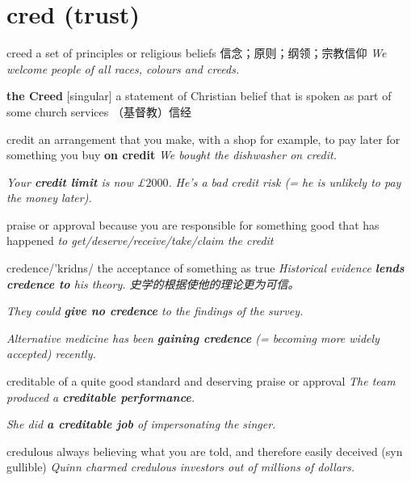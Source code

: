 \section{cred (trust)}

\begin{DefWord}{creed}
    a set of principles or religious beliefs 信念；原则；纲领；宗教信仰
    \textit{We welcome people of all races, colours and creeds.}

    \textbf{the Creed} [singular] a statement of Christian belief that is spoken as part of some church services （基督教）信经
\end{DefWord}

\begin{DefWord}{credit}
    an arrangement that you make, with a shop for example, to pay later for something you buy
    \textbf{on credit} \textit{We bought the dishwasher on credit.}

    \textit{Your \textbf{credit limit} is now \pounds$2 000$.}
    \textit{He's a bad credit risk (= he is unlikely to pay the money later).}

    praise or approval because you are responsible for something good that has happened
    \textit{to get/deserve/receive/take/claim the credit}
\end{DefWord}

\begin{DefWord}{credence}/'kridns/
    the acceptance of something as true
    \textit{Historical evidence \textbf{lends credence to} his theory. 史学的根据使他的理论更为可信。}

    \textit{They could \textbf{give no credence} to the findings of the survey.}

    \textit{Alternative medicine has been \textbf{gaining credence} (= becoming more widely accepted) recently.}
\end{DefWord}

\begin{DefWord}{creditable}
    of a quite good standard and deserving praise or approval
    \textit{The team produced a \textbf{creditable performance}.}

    \textit{She did \textbf{a creditable job} of impersonating the singer.}
\end{DefWord}

\begin{DefWord}{credulous}
    always believing what you are told, and therefore easily deceived (syn gullible)
    \textit{Quinn charmed credulous investors out of millions of dollars.}
\end{DefWord}

